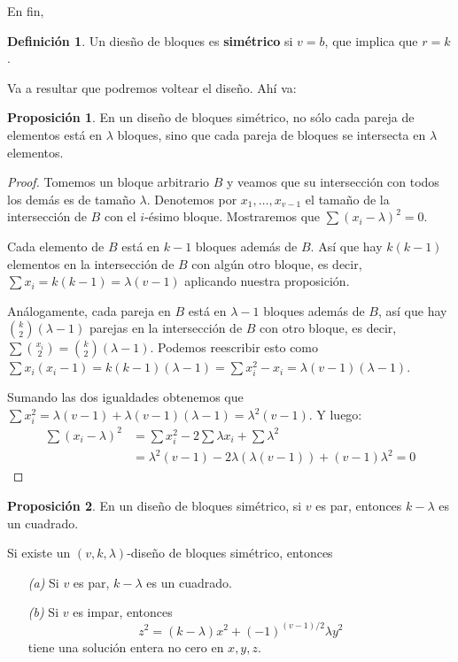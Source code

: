 \documentclass[spanish]{book}
\theoremstyle{definition}
\newtheorem*{defn}{Definición}
\newtheorem*{prop}{Proposición}
\begin{document}
En fin,
\begin{defn}
	Un diesño de bloques es \textbf{simétrico} si $v=b$, que implica que $r=k$.
\end{defn}
Va a resultar que podremos voltear el diseño. Ahí va:
\begin{prop}
	En un diseño de bloques simétrico, no sólo cada pareja de elementos está en $\lambda$ bloques, sino que cada pareja de bloques se intersecta en $\lambda$ elementos.
\end{prop}
\begin{proof}
	Tomemos un bloque arbitrario $B$ y veamos que su intersección con todos los demás es de tamaño $\lambda$. Denotemos por $x_1,\ldots,x_{v-1}$ el tamaño de la intersección de $B$ con el $i$-ésimo bloque. Mostraremos que $\sum(x_i-\lambda)^2=0$.
	
	Cada elemento de $B$ está en $k-1$ bloques además de $B$. Así que hay $k(k-1)$ elementos en la intersección de $B$ con algún otro bloque, es decir, $\sum x_i=k(k-1)=\lambda(v-1)$ aplicando nuestra proposición.
	
	Análogamente, cada pareja en $B$ está en $\lambda -1$ bloques además de $B$, así que hay ${k\choose 2}(\lambda-1)$ parejas en la intersección de $B$ con otro bloque, es decir, $\sum{x_i\choose 2}={k\choose 2}(\lambda-1)$. Podemos reescribir esto como $\sum x_i(x_i-1)=k(k-1)(\lambda-1)=\sum x_i^2-x_i=\lambda(v-1)(\lambda-1)$.
	
	Sumando las dos igualdades obtenemos que $\sum x_i^2=\lambda(v-1)+\lambda(v-1)(\lambda-1)=\lambda^2(v-1)$. Y luego:
	\begin{align*}
		\sum(x_i-\lambda)^2&=\sum x_i^2-2\sum\lambda x_i+\sum \lambda^2\\
		&=\lambda^2(v-1)-2\lambda(\lambda(v-1))+(v-1)\lambda^2=0
	\end{align*}
\end{proof}
\begin{prop}
	En un diseño de bloques simétrico, si $v$ es par, entonces $k-\lambda$ es un cuadrado.
\end{prop}
\begin{teo}
	Si existe un $(v,k,\lambda)$-diseño de bloques simétrico, entonces
	\begin{enumerate}
		\item[\textit{(a)}] Si $v$ es par, $k-\lambda$ es un cuadrado.
		\item[\textit{(b)}] Si $v$ es impar, entonces
		\[z^2=(k-\lambda)x^2+(-1)^{(v-1)/2}\lambda y^2\]
		tiene una solución entera no cero en $x,y,z$.
	\end{enumerate}
\end{teo}
\end{document}
